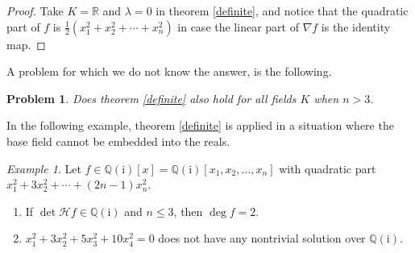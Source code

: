 \documentclass[10pt]{article}
\newtheorem{problem}[theorem]{Problem}
\theoremstyle{remark}
\newtheorem{example}[theorem]{Example}
\theoremstyle{definition}
\newcommand{\hess}{{\mathcal H}}
\newcommand{\grad}{\nabla}
\newcommand{\R}{{\mathbb R}}
\newcommand{\Q}{{\mathbb Q}}
\newcommand{\I}{{\mathrm i}}
\begin{document}
\begin{proof}
Take $K = \R$ and $\lambda = 0$ in theorem \ref{definite}, and notice that the quadratic part of $f$
is $\frac12(x_1^2 + x_2^2 + \cdots + x_n^2)$ in case the linear part of $\grad f$ is the identity map.
\end{proof}

\noindent
A problem for which we do not know the answer, is the following.

\begin{problem}
Does theorem \ref{definite} also hold for all fields $K$ when $n > 3$. 
\end{problem}

\noindent
In the following example, theorem \ref{definite} is applied in a situation where the base
field cannot be embedded into the reals.

\begin{example}
Let $f \in \Q(\I)[x] = \Q(\I)[x_1,x_2,\allowbreak \ldots,x_n]$ with
quadratic part $x_1^2 + 3 x_2^2 + \cdots + (2n-1)x_n^2$.
\begin{enumerate}

\item[i)] If $\det \hess f \in \Q(\I)$ and $n \le 3$, then $\deg f = 2$.

\item[ii)] $x_1^2 + 3 x_2^2 + 5 x_3^2 + 10 x_4^2 = 0$ does not have any nontrivial solution
over $\Q(\I)$. 

\end{enumerate}
\end{example}
\end{document}
